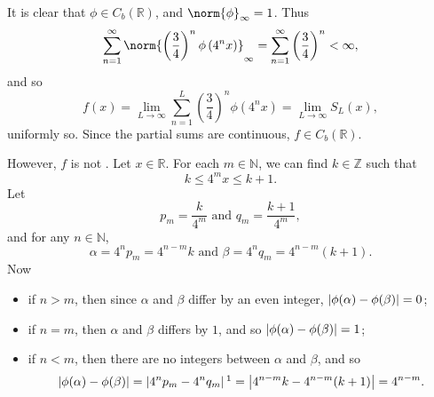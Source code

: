 \documentclass[notoc,notitlepage]{tufte-book}
\begin{document}
\begin{eg}
  It is clear that $\phi \in C_b(\mathbb{R})$, and $\norm{ \phi }_\infty = 1$. Thus
  \begin{equation*}
    \sum_{n=1}^{\infty} \norm{ \left( \frac{3}{4} \right)^n \phi \left( 4^n x \right)}_\infty = \sum_{n=1}^{\infty} \left( \frac{3}{4} \right)^n < \infty,
  \end{equation*}
  and so
  \begin{equation*}
    f(x) = \lim_{L \to \infty} \sum_{n=1}^{L} \left( \frac{3}{4} \right)^n \phi \left( 4^n x \right) = \lim_{L \to \infty} S_L(x),
  \end{equation*}
  uniformly so. Since the partial sums are continuous, $f \in C_b(\mathbb{R})$.

  However, $f$ is not . Let $x \in \mathbb{R}$. For each $m \in \mathbb{N}$, we can find $k \in \mathbb{Z}$ such that
  \begin{equation*}
    k \leq 4^m x \leq k + 1.
  \end{equation*}
  Let
  \begin{equation*}
    p_m = \frac{k}{4^m} \text{ and } q_m = \frac{k + 1}{4^m},
  \end{equation*}
  and for any $n \in \mathbb{N}$,
  \begin{equation*}
    \alpha = 4^n p_m = 4^{n - m} k \text{ and } \beta = 4^n q_m = 4^{ n - m } ( k + 1 ).
  \end{equation*}
  Now
  \begin{itemize}
    \item if $n > m$, then since $\alpha$ and $\beta$ differ by an even integer, $\left| \phi ( \alpha ) - \phi ( \beta ) \right| = 0$;
    \item if $n = m$, then $\alpha$ and $\beta$ differs by $1$, and so $\left| \phi(\alpha) - \phi(\beta) \right| = 1$;
    \item if $n < m$, then there are no integers between $\alpha$ and $\beta$, and so
      \begin{equation*}
        \abs{ \phi(\alpha) - \phi(\beta) } = \abs{ 4^n p_m - 4^n q_m } \footnotemark = \abs{ 4^{n - m} k - 4^{n - m} ( k + 1 ) } = 4^{n - m}.
      \end{equation*}
  \end{itemize}


\end{eg}
\end{document}
